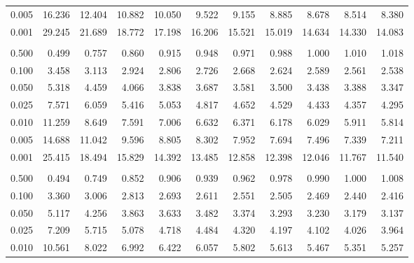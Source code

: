 \documentclass[
]{article}
\begin{document}
\begin{longtable}[t]{lrrrrrrrrrr}
\hspace{1em}0.005 & 16.236 & 12.404 & 10.882 & 10.050 & 9.522 & 9.155 & 8.885 & 8.678 & 8.514 & 8.380\\
\hspace{1em}0.001 & 29.245 & 21.689 & 18.772 & 17.198 & 16.206 & 15.521 & 15.019 & 14.634 & 14.330 & 14.083\\
\addlinespace[0.3em]
\multicolumn{11}{l}{\textbf{$k_2=8$}}\\
\hspace{1em}0.500 & 0.499 & 0.757 & 0.860 & 0.915 & 0.948 & 0.971 & 0.988 & 1.000 & 1.010 & 1.018\\
\hspace{1em}0.100 & 3.458 & 3.113 & 2.924 & 2.806 & 2.726 & 2.668 & 2.624 & 2.589 & 2.561 & 2.538\\
\hspace{1em}0.050 & 5.318 & 4.459 & 4.066 & 3.838 & 3.687 & 3.581 & 3.500 & 3.438 & 3.388 & 3.347\\
\hspace{1em}0.025 & 7.571 & 6.059 & 5.416 & 5.053 & 4.817 & 4.652 & 4.529 & 4.433 & 4.357 & 4.295\\
\hspace{1em}0.010 & 11.259 & 8.649 & 7.591 & 7.006 & 6.632 & 6.371 & 6.178 & 6.029 & 5.911 & 5.814\\
\hspace{1em}0.005 & 14.688 & 11.042 & 9.596 & 8.805 & 8.302 & 7.952 & 7.694 & 7.496 & 7.339 & 7.211\\
\hspace{1em}0.001 & 25.415 & 18.494 & 15.829 & 14.392 & 13.485 & 12.858 & 12.398 & 12.046 & 11.767 & 11.540\\
\addlinespace[0.3em]
\multicolumn{11}{l}{\textbf{$k_2=9$}}\\
\hspace{1em}0.500 & 0.494 & 0.749 & 0.852 & 0.906 & 0.939 & 0.962 & 0.978 & 0.990 & 1.000 & 1.008\\
\hspace{1em}0.100 & 3.360 & 3.006 & 2.813 & 2.693 & 2.611 & 2.551 & 2.505 & 2.469 & 2.440 & 2.416\\
\hspace{1em}0.050 & 5.117 & 4.256 & 3.863 & 3.633 & 3.482 & 3.374 & 3.293 & 3.230 & 3.179 & 3.137\\
\hspace{1em}0.025 & 7.209 & 5.715 & 5.078 & 4.718 & 4.484 & 4.320 & 4.197 & 4.102 & 4.026 & 3.964\\
\hspace{1em}0.010 & 10.561 & 8.022 & 6.992 & 6.422 & 6.057 & 5.802 & 5.613 & 5.467 & 5.351 & 5.257\\

\end{longtable}
\end{document}
